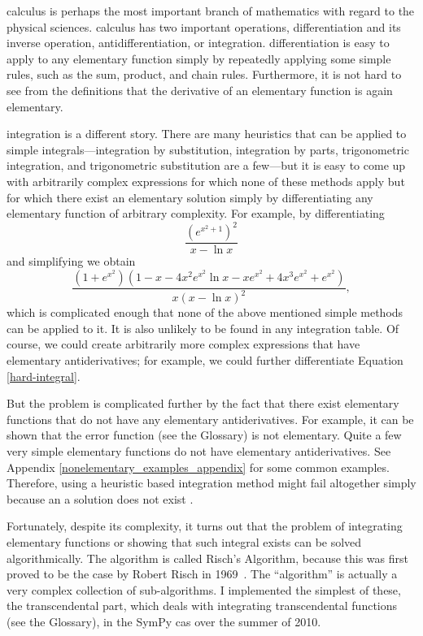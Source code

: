 \Gls{calculus} is perhaps the most important branch of mathematics with
regard to the physical sciences.  \Gls{calculus} has two important
operations, \gls{differentiation} and its inverse operation,
antidifferentiation, or \gls{integration}.  \Gls{differentiation} is
easy to apply to any \gls{elementary} function simply by repeatedly
applying some simple rules, such as the sum, product, and chain rules.
Furthermore, it is not hard to see from the definitions that the
derivative of an \gls{elementary} function is again \gls{elementary}.

\Gls{integration} is a different story.  There are many heuristics that
can be applied to simple integrals---\gls{integration} by substitution,
\gls{integration} by parts, trigonometric \gls{integration}, and
trigonometric substitution are a few---but it is easy to come up with
arbitrarily complex expressions for which none of these methods apply
but for which there exist an \gls{elementary} solution simply by
differentiating any \gls{elementary} function of arbitrary complexity.  For
example, by differentiating
\begin{equation}
\label{hard-integral-sol}
    \frac{\left(e^{x^{2} + 1}\right)^{2}}{x - \ln{x}}
\end{equation}
and simplifying we obtain
\begin{equation}
\label{hard-integral}
    \frac{\left(1 + e^{x^{2}}\right) \left(1 - x - 4 x^{2} e^{x^{2}}
    \ln{x} - x e^{x^{2}} + 4 x^{3} e^{x^{2}} +
    e^{x^{2}}\right)}{x \left(x -
    \ln{x}\right)^{2}},
\end{equation}
which is complicated enough that none of the above mentioned simple
methods can be applied to it.  It is also unlikely to be found in any
\gls{integration} table.  Of course, we could create arbitrarily more complex
expressions that have \gls{elementary} antiderivatives; for example, we
could further differentiate Equation \ref{hard-integral}. 

But the problem is complicated further by the fact that there exist
\gls{elementary} functions that do not have any \gls{elementary}
antiderivatives.  For example, it can be shown that the \gls{error
function} (see the Glossary) is not \gls{elementary}.  Quite a few very simple
\gls{elementary} functions do not have \gls{elementary} antiderivatives.  See
Appendix \ref{nonelementary_examples_appendix} for some common examples.
Therefore, using a heuristic based \gls{integration} method might fail
altogether simply because an a solution does not exist .

Fortunately, despite its complexity, it turns out that the problem of
integrating \gls{elementary} functions or showing that such integral exists
can be solved algorithmically.  The algorithm is called Risch's
Algorithm, because this was first proved to be the case by Robert Risch
in 1969~\cite{risch1969problem}.  The ``algorithm'' is actually a very
complex collection of sub-algorithms.  I implemented the simplest of
these, the \gls{transcendental} part, which deals with integrating
\gls{transcendental} functions (see the Glossary), in the SymPy
\gls{cas} over the summer of 2010.
